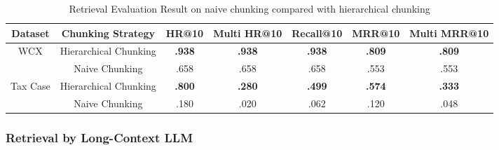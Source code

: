 \begin{table}[!ht]
\centering
\caption{Retrieval Evaluation Result on naive chunking compared with hierarchical chunking}
\renewcommand{\arraystretch}{1.5} %
\label{table: retrieval_chunk}
\begin{tabular}{@{}c|cccccc@{}}
\toprule
Dataset                   & Chunking Strategy     & \multicolumn{1}{l}{HR@10} & \multicolumn{1}{l}{Multi HR@10} & \multicolumn{1}{l}{Recall@10} & \multicolumn{1}{l}{MRR@10} & \multicolumn{1}{l}{Multi MRR@10} \\ \midrule
\multirow{2}{*}{WCX}      & Hierarchical Chunking & \textbf{.938}             & \textbf{.938}                   & \textbf{.938}                 & \textbf{.809}              & \textbf{.809}                    \\
                          & Naive Chunking        & .658                      & .658                            & .658                          & .553                       & .553                             \\ \midrule
\multirow{2}{*}{Tax Case} & Hierarchical Chunking & \textbf{.800}             & \textbf{.280}                   & \textbf{.499}                 & \textbf{.574}              & \textbf{.333}                    \\
                          & Naive Chunking        & .180                      & .020                            & .062                          & .120                       & .048                             \\ \bottomrule
\end{tabular}
\end{table}

\subsubsection{Retrieval by Long-Context LLM}
\label{subsubsec:re_result_sample}


